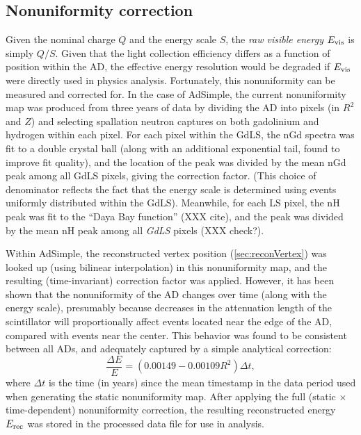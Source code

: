 \documentclass[../thesis.tex]{subfiles}
\begin{document}
\subsection{Nonuniformity correction}
\label{sec:reconEnergyNU}

Given the nominal charge $Q$ and the energy scale $S$, the \emph{raw visible
  energy} $E_\mathrm{vis}$ is simply $Q/S$. Given that the light collection efficiency
differs as a function of position within the AD, the effective energy resolution
would be degraded if $E_\mathrm{vis}$ were directly used in physics
analysis. Fortunately, this nonuniformity can be measured and corrected for. In
the case of AdSimple, the current nonuniformity map was produced from three
years of data by dividing the AD into pixels (in $R^2$ and $Z$) and selecting
spallation neutron captures on both gadolinium and hydrogen within each
pixel. For each pixel within the GdLS, the nGd spectra was fit to a double
crystal ball (along with an additional exponential tail, found to improve fit
quality), and the location of the peak was divided by the mean nGd peak among
all GdLS pixels, giving the correction factor. (This choice of denominator
reflects the fact that the energy scale is determined using events uniformly
distributed within the GdLS). Meanwhile, for each LS pixel, the nH peak was fit
to the ``Daya Bay function'' (XXX cite), and the peak was divided by the mean nH
peak among all \emph{GdLS} pixels (XXX check?).

Within AdSimple, the reconstructed vertex position (\autoref{sec:reconVertex})
was looked up (using bilinear interpolation) in this nonuniformity map, and the
resulting (time-invariant) correction factor was applied. However, it has been
shown that the nonuniformity of the AD changes over time (along with the energy
scale), presumably because decreases in the attenuation length of the
scintillator will proportionally affect events located near the edge of the AD,
compared with events near the center. This behavior was found to be consistent
between all ADs, and adequately captured by a simple analytical correction:
\begin{equation*}
  \frac{\Delta E}{E} = (0.00149 - 0.00109 R^2) \Delta t,
\end{equation*}
where $\Delta t$ is the time (in years) since the mean timestamp in the data
period used when generating the static nonuniformity map. After applying the
full (static $\times$ time-dependent) nonuniformity correction, the resulting
reconstructed energy $E_\mathrm{rec}$ was stored in the processed data file for use in
analysis.
\end{document}
